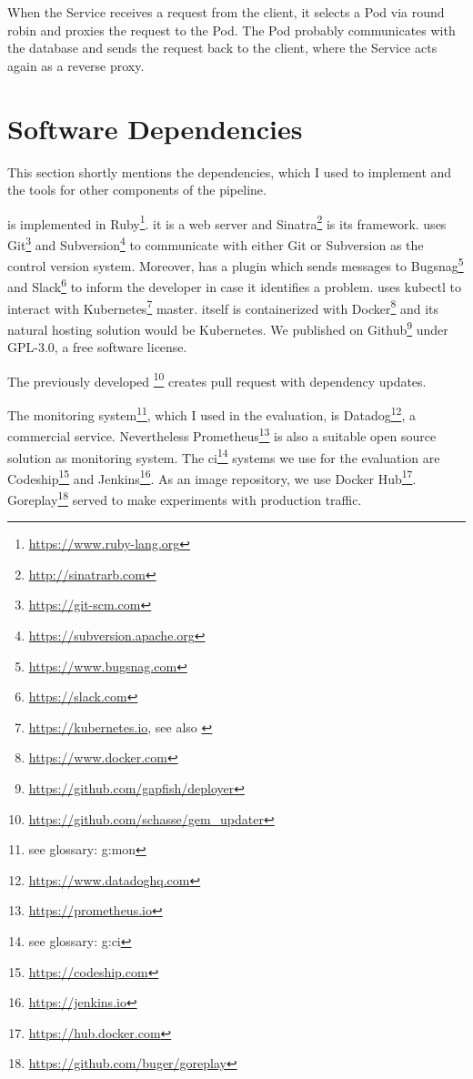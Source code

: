 When the Service receives a request from the client, it selects a Pod via round robin and
proxies the request to the Pod. The Pod probably communicates with the database and sends
the request back to the client, where the Service acts again as a reverse proxy.

\section{Software Dependencies}

This section shortly mentions the dependencies, which I used to implement \deployer and the
tools for other components of the pipeline.

\deployer is implemented in Ruby\footnote{\url{https://www.ruby-lang.org}}. it is a
web server and Sinatra\footnote{\url{http://sinatrarb.com}} is its framework. \deployer uses
Git\footnote{\url{https://git-scm.com}} and
Subversion\footnote{\url{https://subversion.apache.org}} to communicate with either Git or
Subversion as the control version system. Moreover, \deployer has a plugin which sends
messages to Bugsnag\footnote{\url{https://www.bugsnag.com}} and
Slack\footnote{\url{https://slack.com}} to inform the developer in case it identifies a
problem. \deployer uses kubectl to interact with
Kubernetes\footnote{\url{https://kubernetes.io}, see also
  \cite{kubernetes_architecture,kubernetes_architecture2}} master. \deployer itself is
containerized with Docker\footnote{\url{https://www.docker.com}} and its natural hosting
solution would be Kubernetes. We published \deployer on
Github\footnote{\url{https://github.com/gapfish/deployer}} under GPL-3.0, a free software
license.

The previously developed
\gemupdater\footnote{\url{https://github.com/schasse/gem_updater}} creates pull request
with dependency updates.

The monitoring system\footnote{see glossary: \gls{g:mon}}, which I used in the evaluation,
is Datadog\footnote{\url{https://www.datadoghq.com}}, a commercial service. Nevertheless
Prometheus\footnote{\url{https://prometheus.io}} is also a suitable open source solution
as monitoring system. The \gls{ci}\footnote{see glossary: \gls{g:ci}} systems we use for
the evaluation are Codeship\footnote{\url{https://codeship.com}} and
Jenkins\footnote{\url{https://jenkins.io}}. As an image repository, we use Docker
Hub\footnote{\url{https://hub.docker.com}}. Goreplay\footnote{\url{https://github.com/buger/goreplay}}
served to make experiments with production traffic.

